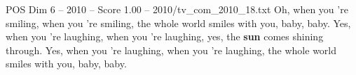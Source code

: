 \begin{textsample}{POS Dim 6 – 2010 – Score 1.00 – 2010/tv\_com\_2010\_18.txt}  \label{ex:f6_pos_067}
Oh, when you 're smiling, when you 're smiling, the whole world smiles with you, baby, baby.
Yes, when you 're laughing, when you 're laughing, yes, the \textbf{sun} comes shining through.
Yes, when you 're laughing, when you 're laughing, the whole world smiles with you, baby, baby.

\end{textsample}

